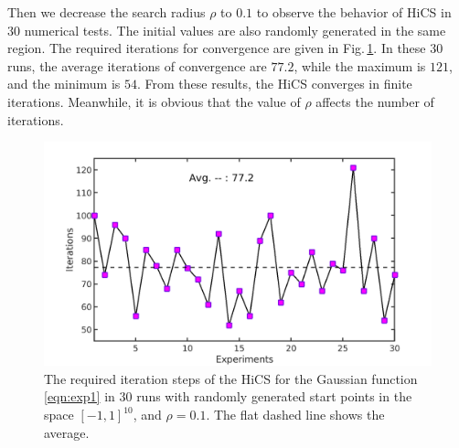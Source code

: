 \documentclass[mathpazo]{csam}
\theoremstyle{remark}
\begin{document}
Then we decrease the search radius $\rho$ to $0.1$ to observe the behavior of
HiCS in $30$ numerical tests. 
The initial values are also randomly generated in the same region.  
The required iterations for convergence are given in
Fig.\,\ref{fig:exp1:randInitr0_1}.
In these $30$ runs, the average iterations of convergence are
$77.2$, while the maximum is $121$, and the minimum is $54$.
From these results, the HiCS converges in
finite iterations. Meanwhile, it is obvious that the value of
$\rho$ affects the number of iterations. 
\begin{figure}[!htbp]
	\centering
	  \includegraphics[scale=0.2]{../figures/gauss10Drandr0_1.png}
	  \caption{
	  The required iteration steps of the 
	  HiCS for the Gaussian function
	  \eqref{eqn:exp1} in $30$ runs with randomly generated start points
	  in the space $[-1, 1]^{10}$, and $\rho=0.1$. 
	  The flat dashed line shows the average.} 
	  \label{fig:exp1:randInitr0_1}
\end{figure}
\end{document}
